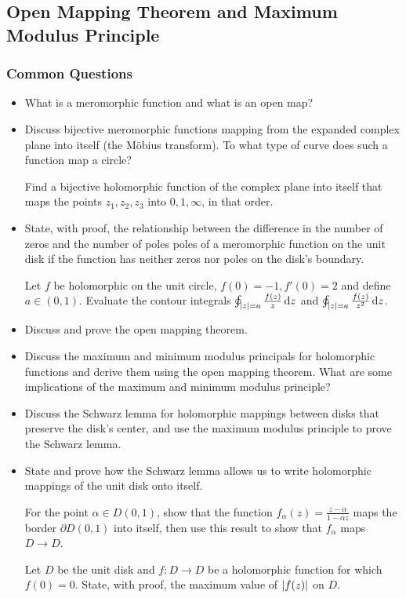 \documentclass[11pt, a4paper]{article}
\newcommand{\diff}{\mathop{}\!\mathrm{d}} %
\begin{document}
\subsection{Open Mapping Theorem and Maximum Modulus Principle}

\subsubsection{Common Questions}
\begin{itemize}
	\item What is a meromorphic function and what is an open map?

	\item Discuss bijective meromorphic functions mapping from the expanded complex plane into itself (the M\"{o}bius transform). To what type of curve does such a function map a circle?
	
	Find a bijective holomorphic function of the complex plane into itself that maps the points $ z_1, z_{2}, z_{3} $ into $ 0, 1, \infty $, in that order.
	

	\item State, with proof, the relationship between the difference in the number of zeros and the number of poles poles of a meromorphic function on the unit disk if the function has neither zeros nor poles on the disk's boundary.
		
	Let $ f $ be holomorphic on the unit circle, $ f(0) = -1, f'(0) = 2 $ and define $ a \in (0, 1) $. Evaluate the contour integrals $ \oint_{\abs{z} = a} \frac{f(z)}{z} \diff z $ and  $ \oint_{\abs{z} = a} \frac{f(z)}{z^2} \diff z $. 

	
	\item Discuss and prove the open mapping theorem.
	
	\item Discuss the maximum and minimum modulus principals for holomorphic functions and derive them using the open mapping theorem. What are some implications of the maximum and minimum modulus principle?
	

	\item Discuss the Schwarz lemma for holomorphic mappings between disks that preserve the disk's center, and use the maximum modulus principle to prove the Schwarz lemma.
	
	\item State and  prove how the Schwarz lemma allows us to write holomorphic mappings of the unit disk onto itself.
	
	For the point $ \alpha \in D(0, 1) $, show that the function $ f_{\alpha}(z) = \frac{z - \alpha}{1 - \overline{\alpha}z} $ maps the border $ \partial D(0, 1) $ into itself, then use this result to show that $ f_{\alpha} $ maps $ D \to D $.
		
	Let $ D $ be the unit disk and $ f:D\to D $ be a holomorphic function for which $ f(0) = 0 $. State, with proof, the maximum value of $ \abs{f(z)} $ on $ D $.
		
\end{itemize}
\end{document}
